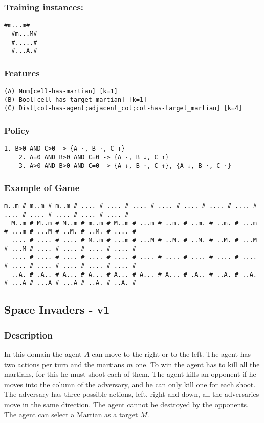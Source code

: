 \documentclass[a4paper]{article}
\begin{document}
\subsubsection{Training instances:}
\begin{Verbatim}[fontsize=\footnotesize]
  #m...m#
  #m...M#
  #.....#
  #...A.#
\end{Verbatim}

\subsubsection{Features}
\begin{Verbatim}[fontsize=\footnotesize]
(A) Num[cell-has-martian] [k=1]
(B) Bool[cell-has-target_martian] [k=1]
(C) Dist[col-has-agent;adjacent_col;col-has-target_martian] [k=4]
\end{Verbatim}

\subsubsection{Policy}
\begin{Verbatim}[fontsize=\footnotesize]
    1. B>0 AND C>0 -> {A ·, B ·, C ↓}
    2. A=0 AND B>0 AND C=0 -> {A ·, B ↓, C ↑}
    3. A>0 AND B>0 AND C=0 -> {A ↓, B ·, C ↑}, {A ↓, B ·, C ·}
\end{Verbatim}

\subsubsection{Example of Game}
\begin{Verbatim}[fontsize=\footnotesize]
  m..m # m..m # m..m # .... # .... # .... # .... # .... # .... # .... # .... # .... # .... # .... # .... #
  M..m # M..m # M..m # m..m # M..m # ...m # ..m. # ..m. # ..m. # ...m # ...m # ...M # ..M. # ..M. # .... #
  .... # .... # .... # M..m # ...m # ...M # ..M. # ..M. # ..M. # ...M # ...M # .... # .... # .... # .... #
  .... # .... # .... # .... # .... # .... # .... # .... # .... # .... # .... # .... # .... # .... # .... #
  ..A. # .A.. # A... # A... # A... # A... # A... # .A.. # ..A. # ..A. # ...A # ...A # ...A # ..A. # ..A. #
\end{Verbatim}

\subsection{Space Invaders - v1}
\subsubsection{Description}
In this domain the agent $A$ can move to the right or to the left. The agent has two actions per turn and the martians $m$ one. To win the agent has to kill all the martians, for this he must shoot each of them. The agent kills an opponent if he moves into the column of the adversary, and he can only kill one for each shoot. The adversary has three possible actions, left, right and down, all the adversaries move in the same direction. The agent cannot be destroyed by the opponents. The agent can select a Martian as a target $M$.
\end{document}
